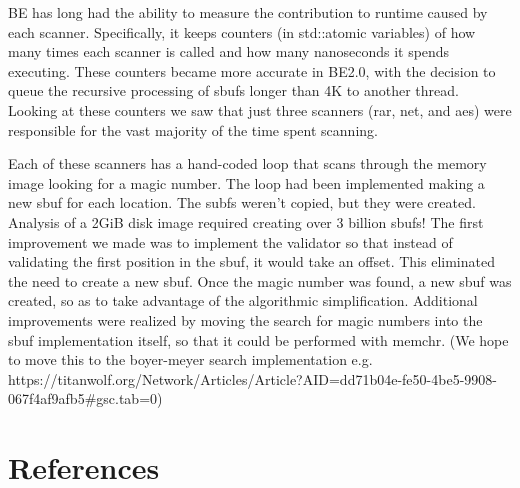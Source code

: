 \documentclass[5p]{elsarticle}
\begin{document}
BE has long had the ability to measure the contribution to runtime
caused by each scanner. Specifically, it keeps counters (in
std::atomic variables) of how many times each scanner is called and
how many nanoseconds it spends executing. These counters became more
accurate in BE2.0, with the decision to queue the recursive processing
of sbufs longer than 4K to another thread. Looking at these counters
we saw that just three scanners (rar, net, and aes) were responsible
for the vast majority of the time spent scanning.

Each of these scanners has a hand-coded loop that scans through the
memory image looking for a magic number. The loop had been implemented
making a new sbuf for each location. The subfs weren't copied, but
they were created.  Analysis of a 2GiB disk image required creating
over 3 billion sbufs!  The first improvement we made was to implement
the validator so that instead of validating the first position in the
sbuf, it would take an offset. This eliminated the need to create a
new sbuf. Once the magic number was found, a new sbuf was created, so
as to take advantage of the algorithmic simplification. Additional
improvements were realized by moving the search for magic numbers into
the sbuf implementation itself, so that it could be performed with
memchr. (We hope to move this to the boyer-meyer search implementation
e.g. https://titanwolf.org/Network/Articles/Article?AID=dd71b04e-fe50-4be5-9908-067f4af9afb5#gsc.tab=0)



\section*{References}


\end{document}
